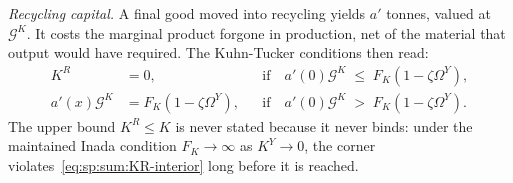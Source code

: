 \emph{Recycling capital.} A final good moved into recycling yields $a'$ tonnes, valued at $\mathcal G^K$. It costs the marginal product forgone in production, net
of the material that output would have required. The Kuhn-Tucker conditions then read:
\begin{subequations}
\label{eq:sp:sum:KR}
\begin{align}
K^R &= 0,
&&\text{if}\quad a'\!\left(0\right)\mathcal G^{K} \;\le\; F_K\left(1-\zeta\Omega^Y\right),
\label{eq:sp:sum:KR-corner}
\\
a'\!\left(x\right)\mathcal G^{K} &= F_K\left(1-\zeta\Omega^Y\right),
&&\text{if}\quad a'\!\left(0\right)\mathcal G^{K} \;>\; F_K\left(1-\zeta\Omega^Y\right).
\label{eq:sp:sum:KR-interior}
\end{align}
\end{subequations}
The upper bound $K^R\le K$ is
never stated because it never binds: under the maintained Inada condition $F_K\to\infty$ as
$K^Y\to0$, the corner
violates~\eqref{eq:sp:sum:KR-interior} long before it is reached.

